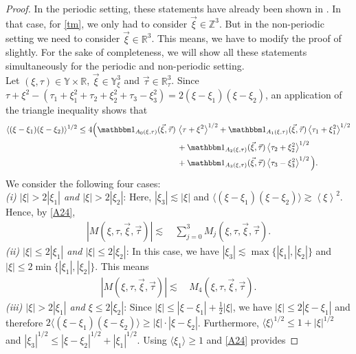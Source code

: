 \documentclass[reqno]{amsart}
\theoremstyle{Definitionl}
\theoremstyle{Definitionk}
\theoremstyle{definition}
\theoremstyle{Satzk}
\theoremstyle{Satzl}
\theoremstyle{Bemerkung}
\begin{document}
\begin{proof}
In the periodic setting, these statements have already been shown in \cite[Lemma 4.1, Lemma 4.2, Thm. 4.1]{Herr}. In that case, for \eqref{tm}, we only had to consider $\vec\xi\in\mathbb Z^3$. But in the non-periodic setting we need to consider $\vec\xi\in\mathbb R^3$. This means, we have to modify the proof of \cite{Herr} slightly. For the sake of completeness, we will show all these statements simultaneously for the periodic and non-periodic setting.\\[10pt]
Let $(\xi,\tau)\in\mathbb Y\times\mathbb R$, $\vec\xi\in\mathbb Y^3_\xi$ and $\vec\tau\in\mathbb R^3_\tau$. Since $\tau+\xi^2-(\tau_1+\xi_1^2+\tau_2+\xi_2^2+\tau_3-\xi_3^2)=2(\xi-\xi_1)(\xi-\xi_2)$, an application of the triangle inequality shows that
\begin{align}
\langle(\xi-\xi_1)(\xi-\xi_2)\rangle^{1/2}
\le 4\Big(\mathbbm1_{A_0(\xi,\tau)}(\vec\xi,\vec\tau)&\,\left\langle\tau+\xi^2\right\rangle^{1/2}+\mathbbm1_{A_1(\xi,\tau)}(\vec\xi,\vec\tau)\left\langle\tau_1+\xi_1^2\right\rangle^{1/2}\nonumber\\
&\,+\mathbbm1_{A_2(\xi,\tau)}(\vec\xi,\vec\tau)\left\langle\tau_2+\xi_2^2\right\rangle^{1/2}\nonumber\\
&\,+\mathbbm1_{A_3(\xi,\tau)}(\vec\xi,\vec\tau)\left\langle\tau_3-\xi_3^2\right\rangle^{1/2}\Big)\label{A24}.
\end{align}
We consider the following four cases:\\[10pt]
\emph{(i) $|\xi|>2|\xi_1|$ and $|\xi|>2|\xi_2|$}: Here, $|\xi_3|\lesssim |\xi|$ and $\langle(\xi-\xi_1)(\xi-\xi_2)\rangle\gtrsim \left\langle\xi\right\rangle^2$.
Hence, by \eqref{A24},
\begin{align*}
|M(\xi,\tau,\vec\xi,\vec\tau)|\lesssim&\,\sum_{j=0}^3M_j(\xi,\tau,\vec\xi,\vec\tau).
\end{align*}
\emph{(ii) $|\xi|\le2|\xi_1|$ and $|\xi|\le2|\xi_2|$}: In this case, we have $
|\xi_3|\lesssim\max\{|\xi_1|,|\xi_2|\}$ and $|\xi|\le 2\min\{|\xi_1|,|\xi_2|\}$. This means
\begin{align*}
|M(\xi,\tau,\vec\xi,\vec\tau)|\lesssim&\,M_4(\xi,\tau,\vec\xi,\vec\tau).
\end{align*}
\emph{(iii) $|\xi|>2|\xi_1|$ and $\xi\le2|\xi_2|$}: Since $|\xi|\le |\xi-\xi_1|+\frac12|\xi|$, we have $|\xi|\le 2|\xi-\xi_1|$ and therefore $2\langle(\xi-\xi_1)(\xi-\xi_2)\rangle\ge |\xi|\cdot|\xi-\xi_2|$. Furthermore, $
\langle \xi\rangle^{1/2}\le 1+|\xi|^{1/2}$ and $|\xi_3|^{1/2}\le |\xi-\xi_2|^{1/2}+|\xi_1|^{1/2}$. Using $\langle\xi_1\rangle\ge1$ and \eqref{A24} provides

\end{proof}
\end{document}
